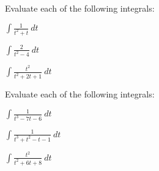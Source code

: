   \begin{problem}

  \item Evaluate each of the following integrals:

    \begin{subproblem}
      \item $\int \frac{1}{t^2+t} ~ dt$
        \vfill
      \item $\int \frac{2}{t^2-4} ~ dt$
        \vfill
      \item $\int \frac{t^2}{t^2+2t+1} ~ dt$
        \vfill
    \end{subproblem}


    \clearpage
  \item Evaluate each of the following integrals:

    \begin{subproblem}
      \item $\int \frac{1}{t^3-7t-6} ~ dt$
        \vfill
      \item $\int \frac{1}{t^3+t^2-t-1} ~ dt$
        \vfill
      \item $\int \frac{t^2}{t^2+6t+8} ~ dt$
        \vfill
    \end{subproblem}


\end{problem}
